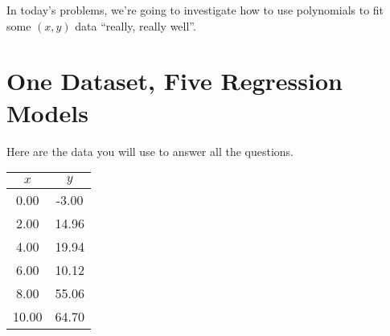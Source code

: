 In today's problems, 
we're going to investigate how to use  polynomials 
to fit some $(x,y)$ data ``really, really well''.

\section*{One Dataset, Five Regression Models}

\begin{minipage}{0.5\textwidth}
    Here are the data you will use to answer all the questions.
\end{minipage}
\begin{minipage}{0.29\textwidth}
\begin{center}
    \Large
    \begin{tabular}{cc}
        \toprule 
        $x$ & $y$ \\ 
        \midrule
        0.00 & -3.00 \\
        2.00 & 14.96 \\
        4.00 & 19.94 \\
        6.00 & 10.12 \\
        8.00 & 55.06 \\
        10.00 & 64.70 \\
        \bottomrule
    \end{tabular}
\end{center}
\end{minipage}

